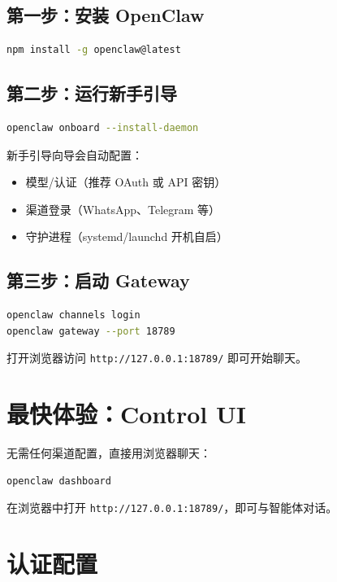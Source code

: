 \subsection{第一步：安装 OpenClaw}

\begin{lstlisting}[language=bash]
npm install -g openclaw@latest
\end{lstlisting}

\subsection{第二步：运行新手引导}

\begin{lstlisting}[language=bash]
openclaw onboard --install-daemon
\end{lstlisting}

新手引导向导会自动配置：
\begin{itemize}
  \item 模型/认证（推荐 OAuth 或 API 密钥）
  \item 渠道登录（WhatsApp、Telegram 等）
  \item 守护进程（systemd/launchd 开机自启）
\end{itemize}

\subsection{第三步：启动 Gateway}

\begin{lstlisting}[language=bash]
openclaw channels login
openclaw gateway --port 18789
\end{lstlisting}

打开浏览器访问 \texttt{http://127.0.0.1:18789/} 即可开始聊天。

\section{最快体验：Control UI}

无需任何渠道配置，直接用浏览器聊天：

\begin{lstlisting}[language=bash]
openclaw dashboard
\end{lstlisting}

在浏览器中打开 \texttt{http://127.0.0.1:18789/}，即可与智能体对话。

\section{认证配置}

